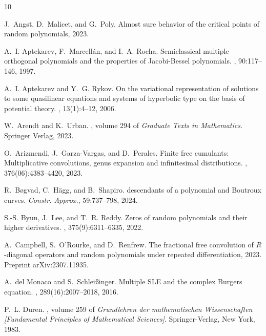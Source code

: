 \documentclass[reqno,11pt]{amsart}
\theoremstyle{plain}
\theoremstyle{definition}
\theoremstyle{remark}
\numberwithin{equation}{section}
\numberwithin{equation}{section}
\begin{document}
\def\cprime{$'$}
\begin{thebibliography}{10}
	
	J.~Angst, D.~Malicet, and G.~Poly.
	\newblock Almost sure behavior of the critical points of random polynomials,
	2023.
	
	A.~I. Aptekarev, F.~Marcell\'an, and I.~A. Rocha.
	\newblock Semiclassical multiple orthogonal polynomials and the properties of
	{J}acobi-{B}essel polynomials.
	, 90:117--146, 1997.
	
	A.~I. Aptekarev and Y.~G. Rykov.
	\newblock On the variational representation of solutions to some quasilinear
	equations and systems of hyperbolic type on the basis of potential theory.
	, 13(1):4--12, 2006.
	
	W.~Arendt and K.~Urban.
	, volume 294 of {\em Graduate Texts in Mathematics}.
	\newblock Springer Verlag, 2023.
	
	O.~Arizmendi, J.~Garza-Vargas, and D.~Perales.
	\newblock Finite free cumulants: Multiplicative convolutions, genus expansion
	and infinitesimal distributions.
	,
	376(06):4383--4420, 2023.
	
	R.~B{\o}gvad, C.~H{\"a}gg, and B.~Shapiro.
	 descendants of a polynomial and {Boutroux} curves.
	\newblock \textit{Constr. Approx.}, 59:737--798, 2024.
	
	S.-S. Byun, J.~Lee, and T.~R. Reddy.
	\newblock Zeros of random polynomials and their higher derivatives.
	, 375(9):6311--6335, 2022.
	
	A.~Campbell, S.~O'Rourke, and D.~Renfrew.
	\newblock The fractional free convolution of {$R$}-diagonal operators and
	random polynomials under repeated differentiation, 2023.
	\newblock Preprint {arXiv:2307.11935}.
	
	A.~del Monaco and S.~Schlei\ss inger.
	\newblock Multiple {SLE} and the complex {B}urgers equation.
	, 289(16):2007--2018, 2016.
	
	P.~L. Duren.
	, volume 259 of {\em Grundlehren der
		mathematischen Wissenschaften [Fundamental Principles of Mathematical
		Sciences]}.
	\newblock Springer-Verlag, New York, 1983.
	

\end{thebibliography}
\end{document}
